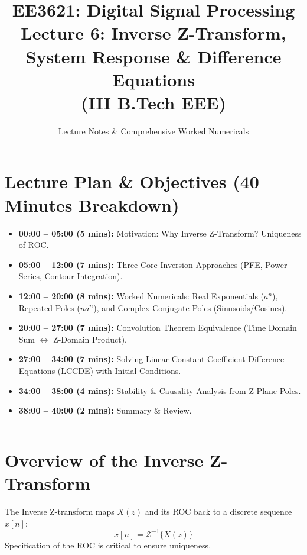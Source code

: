 \documentclass[11pt,a4paper]{article}
\title{\textbf{EE3621: Digital Signal Processing} \\ \Large Lecture 6: Inverse Z-Transform, System Response \& Difference Equations \\ \large (III B.Tech EEE)}
\author{Lecture Notes \& Comprehensive Worked Numericals}
\date{}
\begin{document}
\maketitle

\section{Lecture Plan \& Objectives (40 Minutes Breakdown)}
\begin{itemize}
    \item \textbf{00:00 -- 05:00 (5 mins):} Motivation: Why Inverse Z-Transform? Uniqueness of ROC.
    \item \textbf{05:00 -- 12:00 (7 mins):} Three Core Inversion Approaches (PFE, Power Series, Contour Integration).
    \item \textbf{12:00 -- 20:00 (8 mins):} Worked Numericals: Real Exponentials ($a^n$), Repeated Poles ($n a^n$), and Complex Conjugate Poles (Sinusoids/Cosines).
    \item \textbf{20:00 -- 27:00 (7 mins):} Convolution Theorem Equivalence (Time Domain Sum $\leftrightarrow$ Z-Domain Product).
    \item \textbf{27:00 -- 34:00 (7 mins):} Solving Linear Constant-Coefficient Difference Equations (LCCDE) with Initial Conditions.
    \item \textbf{34:00 -- 38:00 (4 mins):} Stability \& Causality Analysis from Z-Plane Poles.
    \item \textbf{38:00 -- 40:00 (2 mins):} Summary \& Review.
\end{itemize}

\noindent\rule{\textwidth}{0.5pt}

\section{Overview of the Inverse Z-Transform}
The Inverse Z-transform maps $X(z)$ and its ROC back to a discrete sequence $x[n]$:
\begin{equation}
x[n] = \mathcal{Z}^{-1}\{X(z)\}
\end{equation}
Specification of the ROC is critical to ensure uniqueness.
\end{document}
